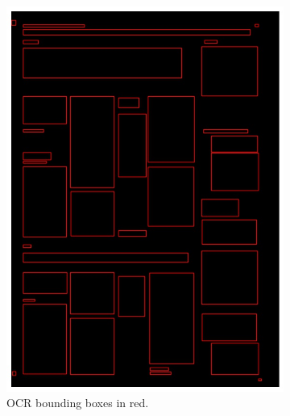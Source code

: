 \documentclass[oneside, english, bibtex]{kththesis}
\begin{document}
\begin{figure}[!htb]
\begin{adjustbox}{center,max size={\textwidth}{0.9\textheight}}
\parbox{1.5\textwidth}{\lineskip=0pt
\begin{subfigure}{0.75\textwidth}
  \centering
  \includegraphics[width=\linewidth, clip=true, trim = 0mm 0mm 0mm 0mm]{figures/ocr/AVThDFz.jpg}
  \caption{OCR bounding boxes in red.}
  \label{fig:AVThDFz_OCR_tf}
\end{subfigure}%
\begin{subfigure}{0.75\textwidth}
  \centering

\end{subfigure}}
\end{adjustbox}
\end{figure}
\end{document}
